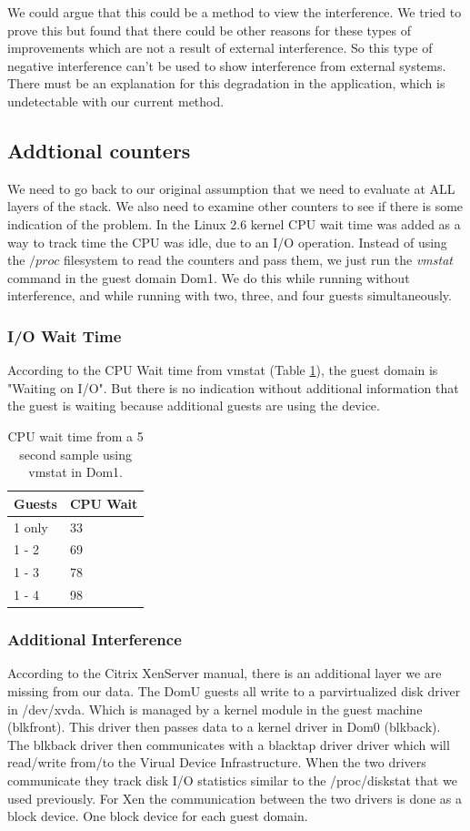 We could argue that this could be a method to view the interference.  
We tried to prove this but found that there could be other reasons for these types of improvements which are not a result of external interference.  
So this type of negative interference can't be used to show interference from external systems. 
There must be an explanation for this degradation in the application, which is undetectable with our current method.

\subsection{Addtional counters}
We need to go back to our original assumption that we need to evaluate at ALL layers of the stack.  We also need to examine other counters to see if there is some indication of the problem.  In the Linux 2.6 kernel CPU wait time was added as a way to track time the CPU was idle, due to an I/O operation.  Instead of using the $/proc$ filesystem to read the counters and pass them, we just run the \emph{vmstat} command in the guest domain Dom1.  We do this while running without interference, and while running with two, three, and four guests simultaneously.

\subsubsection{I/O Wait Time}
According to the CPU Wait time from vmstat (Table \ref{tab:vmstat}), the guest domain is "Waiting on I/O".  
But there is no indication without additional information that the guest is waiting because additional guests are using the device.

\begin{table}[h]
\begin{tabular}{ l p{5cm} }
    Guests &  CPU Wait \\
    \hline
    1 only &  33  \\
    1 - 2  &  69  \\
    1 - 3  &  78  \\ 
    1 - 4  &  98  \\
    \hline
\end{tabular}
\caption{CPU wait time from a 5 second sample using vmstat in Dom1.}
\label{tab:vmstat}
\end{table}

\subsubsection{Additional Interference}
According to the Citrix XenServer manual, there is an additional layer we are missing from our data.   
The DomU guests all write to a parvirtualized disk driver in /dev/xvda.  Which is managed by a kernel module in the guest machine (blkfront).  This driver then passes data to a kernel driver in Dom0 (blkback).  The blkback driver then communicates with a blacktap driver driver which will read/write from/to the Virual Device Infrastructure.   When the two drivers communicate they track disk I/O statistics similar to the /proc/diskstat that we used previously.  For Xen the communication between the two drivers is done as a block device.  One block device for each guest domain.

